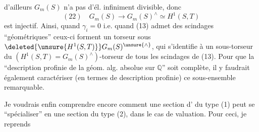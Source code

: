 d'ailleurs $G_m(S)$ n'a pas d'él. infiniment divisible, donc
\[
(22)\quad G_m(S)\longrightarrow G_m(S)^\wedge\simeq H^1(S,T)
\]
est injectif. Ainsi, quand $\gamma_i=0$ i.e. quand (13) admet des scindages ``géométriques''  ceux-ci forment un torseur sous $\deleted{\unsure{H^1(S,T)}}G_m(S)^{\unsure{\wedge}}$, qui s'identifie à un sous-torseur du $(H^1(S,T)=G_m(S)^\wedge)$-torseur de tous les scindages de (13). Pour que la ``description profinie de la géom. alg. absolue sur $\mathbb Q$'' soit complète, il y faudrait également caractériser (en termes de  description profinie) ce sous-ensemble remarquable.

Je voudrais enfin comprendre encore comment une section d' du type (1) peut se ``spécialiser'' en une section du type (2), dans le cas de  valuation. Pour ceci, je reprends
